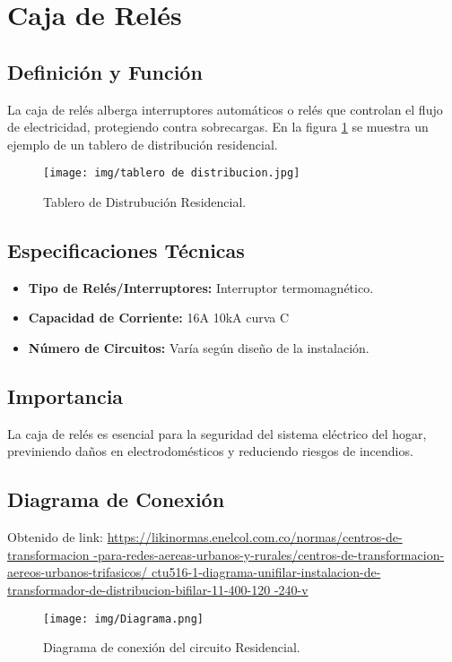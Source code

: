 \documentclass[conference]{IEEEtran}
\theoremstyle{mytheoremstyle}
\theoremstyle{mytheoremstyle}
\theoremstyle{myproblemstyle}
\begin{document}
        \section{Caja de Relés}
        
        \subsection{Definición y Función}
        La caja de relés alberga interruptores automáticos o relés que controlan el flujo de electricidad, protegiendo contra sobrecargas.
        En la figura \ref{fig:tablero} se muestra un ejemplo de un tablero de distribución residencial.
        \begin{figure}[h] %
            \centering
            \texttt{[image: img/tablero de distribucion.jpg]} %
            \caption{Tablero de Distrubución Residencial.}
            \label{fig:tablero}
        \end{figure}

        \subsection{Especificaciones Técnicas}
        \begin{itemize}
            \item \textbf{Tipo de Relés/Interruptores:} Interruptor termomagnético.
            \item \textbf{Capacidad de Corriente:} 16A 10kA curva C
            \item \textbf{Número de Circuitos:} Varía según diseño de la instalación.
        \end{itemize}
        
        \subsection{Importancia}
        La caja de relés es esencial para la seguridad del sistema eléctrico del hogar, previniendo daños en electrodomésticos y reduciendo riesgos de incendios.
                
        \subsection{Diagrama de Conexión}
        Obtenido de link: \url{https://likinormas.enelcol.com.co/normas/centros-de-transformacion
        -para-redes-aereas-urbanos-y-rurales/centros-de-transformacion-aereos-urbanos-trifasicos/
        ctu516-1-diagrama-unifilar-instalacion-de-transformador-de-distribucion-bifilar-11-400-120
        -240-v}
        \begin{figure}[h] %
            \centering
            \texttt{[image: img/Diagrama.png]} %
            \caption{Diagrama de conexión del circuito Residencial.}
            \label{fig:Residencial}
        \end{figure}
\end{document}
